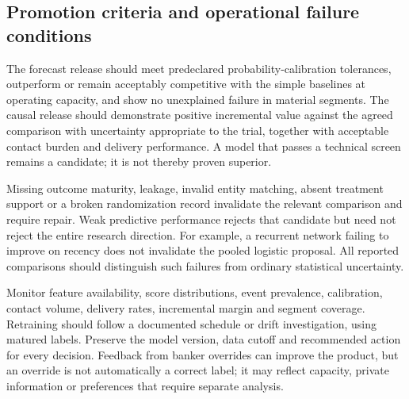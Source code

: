 \subsection{Promotion criteria and operational failure conditions}

The forecast release should meet predeclared probability-calibration tolerances, outperform or remain acceptably competitive with the simple baselines at operating capacity, and show no unexplained failure in material segments. The causal release should demonstrate positive incremental value against the agreed comparison with uncertainty appropriate to the trial, together with acceptable contact burden and delivery performance. A model that passes a technical screen remains a candidate; it is not thereby proven superior.

Missing outcome maturity, leakage, invalid entity matching, absent treatment support or a broken randomization record invalidate the relevant comparison and require repair. Weak predictive performance rejects that candidate but need not reject the entire research direction. For example, a recurrent network failing to improve on recency does not invalidate the pooled logistic proposal. All reported comparisons should distinguish such failures from ordinary statistical uncertainty.

Monitor feature availability, score distributions, event prevalence, calibration, contact volume, delivery rates, incremental margin and segment coverage. Retraining should follow a documented schedule or drift investigation, using matured labels. Preserve the model version, data cutoff and recommended action for every decision. Feedback from banker overrides can improve the product, but an override is not automatically a correct label; it may reflect capacity, private information or preferences that require separate analysis.
